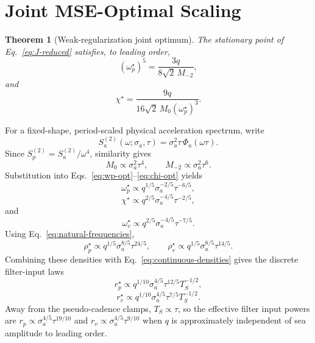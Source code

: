 \documentclass[conference]{IEEEtran}
\newtheorem{theorem}{Theorem}
\begin{document}
\section{Joint MSE-Optimal Scaling}
\label{sec:optimal-scaling}

\begin{theorem}[Weak-regularization joint optimum]
The stationary point of Eq.~\eqref{eq:J-reduced} satisfies, to leading order,
\begin{equation}
 \boxed{
 (\omega_p^\star)^5
 =\frac{3q}{8\sqrt{2}\,M_{-2}},}
 \label{eq:wp-opt}
\end{equation}
and
\begin{equation}
 \boxed{
 \chi^\star
 =\frac{9q}
 {16\sqrt{2}\,M_0(\omega_p^\star)^3}.}
 \label{eq:chi-opt}
\end{equation}
\end{theorem}

For a fixed-shape, period-scaled physical acceleration spectrum, write
\begin{equation}
 S_a^{(2)}(\omega;\sigma_a,\tau)
 =\sigma_a^2\tau\,\Phi_a(\omega\tau).
\end{equation}
Since $S_p^{(2)}=S_a^{(2)}/\omega^4$, similarity gives
\begin{equation}
 M_0\propto\sigma_a^2\tau^4,
 \qquad
 M_{-2}\propto\sigma_a^2\tau^6.
 \label{eq:moment-scaling}
\end{equation}
Substitution into Eqs.~\eqref{eq:wp-opt}--\eqref{eq:chi-opt} yields
\begin{equation}
 \omega_p^\star
 \propto q^{1/5}\sigma_a^{-2/5}\tau^{-6/5},
\end{equation}
\begin{equation}
 \chi^\star
 \propto q^{2/5}\sigma_a^{-4/5}\tau^{-2/5},
\end{equation}
and
\begin{equation}
 \omega_v^\star
 \propto q^{2/5}\sigma_a^{-4/5}\tau^{-7/5}.
\end{equation}
Using Eq.~\eqref{eq:natural-frequencies},
\begin{equation}
 \rho_p^\star
 \propto q^{1/5}\sigma_a^{8/5}\tau^{24/5},
 \qquad
 \rho_v^\star
 \propto q^{1/5}\sigma_a^{8/5}\tau^{14/5}.
\end{equation}
Combining these densities with Eq.~\eqref{eq:continuous-densities} gives the
discrete filter-input laws
\begin{equation}
 \boxed{
 r_p^\star
 \propto q^{1/10}\sigma_a^{4/5}\tau^{12/5}T_S^{-1/2},}
 \label{eq:rp-opt}
\end{equation}
\begin{equation}
 \boxed{
 r_v^\star
 \propto q^{1/10}\sigma_a^{4/5}\tau^{7/5}T_S^{-1/2}.}
 \label{eq:rv-opt}
\end{equation}
Away from the pseudo-cadence clamps, $T_S\propto\tau$, so the effective filter
input powers are $r_p\propto\sigma_a^{4/5}\tau^{19/10}$ and
$r_v\propto\sigma_a^{4/5}\tau^{9/10}$ when $q$ is approximately independent of
sea amplitude to leading order.
\end{document}
